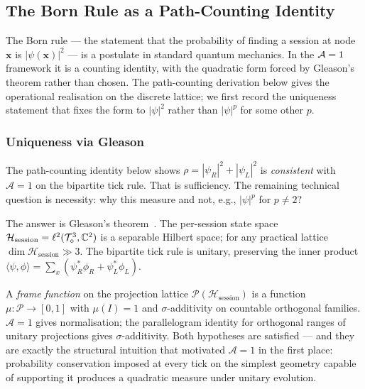 
\subsection{The Born Rule as a Path-Counting Identity}
\label{subsec:born_rule_paths}

The Born rule --- the statement that the probability of finding
a session at node $\mathbf{x}$ is $|\psi(\mathbf{x})|^2$ --- is
a postulate in standard quantum mechanics.
In the $\mathcal{A}=1$ framework it is a counting identity, with the
quadratic form forced by Gleason's theorem rather than chosen.
The path-counting derivation below gives the operational realisation
on the discrete lattice; we first record the uniqueness statement
that fixes the form to $|\psi|^2$ rather than $|\psi|^p$ for some
other $p$.

\subsubsection*{Uniqueness via Gleason}
\label{subsubsec:born_gleason}

The path-counting identity below shows $\rho = |\psi_R|^2 + |\psi_L|^2$
is \emph{consistent} with $\mathcal{A}=1$ on the bipartite tick rule.
That is sufficiency.  The remaining technical question is necessity:
why this measure and not, e.g., $|\psi|^p$ for $p \ne 2$?

The answer is Gleason's theorem~\cite{gleason1957}.  The per-session
state space $\mathcal{H}_\text{session} = \ell^2(\mathcal{T}_\diamond^3,\mathbb{C}^2)$
is a separable Hilbert space; for any practical lattice
$\dim \mathcal{H}_\text{session} \gg 3$.  The bipartite tick rule is
unitary, preserving the inner product
$\langle\psi, \phi\rangle = \sum_x (\psi_R^*\phi_R + \psi_L^*\phi_L)$.

A \emph{frame function} on the projection lattice
$\mathcal{P}(\mathcal{H}_\text{session})$ is a function
$\mu : \mathcal{P} \to [0,1]$ with $\mu(I) = 1$ and
$\sigma$-additivity on countable orthogonal families.  $\mathcal{A}=1$
gives normalisation; the parallelogram identity for orthogonal ranges
of unitary projections gives $\sigma$-additivity.  Both hypotheses are
satisfied --- and they are exactly the structural intuition that
motivated $\mathcal{A}=1$ in the first place: probability conservation
imposed at every tick on the simplest geometry capable of supporting
it produces a quadratic measure under unitary evolution.

